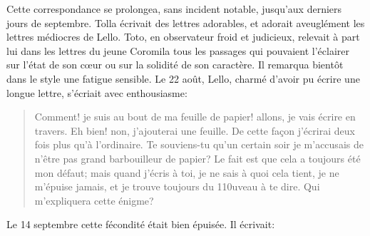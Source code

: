 Cette correspondance se prolongea, sans incident notable, jusqu'aux
derniers jours de septembre. Tolla écrivait des lettres adorables, et
adorait aveuglément les lettres médiocres de Lello. Toto, en observateur
froid et judicieux, relevait à part lui dans les lettres du jeune
Coromila tous les passages qui pouvaient l'éclairer sur l'état de son
cœur ou sur la solidité de son caractère. Il remarqua bientôt dans le
style une fatigue sensible. Le 22 août, Lello, charmé d'avoir pu écrire
une longue lettre, s'écriait avec enthousiasme:

\begin{quote}
Comment! je suis au bout de ma feuille de papier! allons, je vais écrire
en travers. Eh bien! non, j'ajouterai une feuille. De cette façon
j'écrirai deux fois plus qu'à l'ordinaire. Te souviens-tu qu'un certain
soir je m'accusais de n'être pas grand barbouilleur de papier? Le fait
est que cela a toujours été mon défaut; mais quand j'écris à toi, je ne
sais à quoi cela tient, je ne m'épuise jamais, et je trouve toujours du
110uveau à te dire. Qui m'expliquera cette énigme?
\end{quote}

Le 14 septembre cette fécondité était bien épuisée. Il écrivait:

